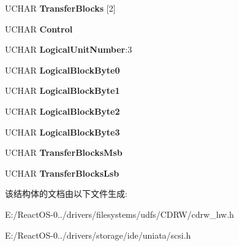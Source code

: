 \begin{DoxyCompactItemize}
\mbox{\label{struct___c_d_b_1_1___c_d_b10_ab3d4fc361e88bdafa199122f30c7bd25}} 
U\+C\+H\+AR {\bfseries Transfer\+Blocks} \mbox{[}2\mbox{]}
\item 
\mbox{\label{struct___c_d_b_1_1___c_d_b10_a61c45e0b32773a2a6463c7eb3a4ce93f}} 
U\+C\+H\+AR {\bfseries Control}
\item 
\mbox{\label{struct___c_d_b_1_1___c_d_b10_aeb78b3c0b7ca1cb5ff6459b6d13ad878}} 
U\+C\+H\+AR {\bfseries Logical\+Unit\+Number}\+:3
\item 
\mbox{\label{struct___c_d_b_1_1___c_d_b10_a681672e015a669b7182b9a05927e240e}} 
U\+C\+H\+AR {\bfseries Logical\+Block\+Byte0}
\item 
\mbox{\label{struct___c_d_b_1_1___c_d_b10_af9cb26c264e8a58efd48e5f1e4dc0cdb}} 
U\+C\+H\+AR {\bfseries Logical\+Block\+Byte1}
\item 
\mbox{\label{struct___c_d_b_1_1___c_d_b10_af07398013c913e7c45304e54d298d080}} 
U\+C\+H\+AR {\bfseries Logical\+Block\+Byte2}
\item 
\mbox{\label{struct___c_d_b_1_1___c_d_b10_aeaa3b17dca88d32cdec062d5873d73e0}} 
U\+C\+H\+AR {\bfseries Logical\+Block\+Byte3}
\item 
\mbox{\label{struct___c_d_b_1_1___c_d_b10_ac29f2eb7a92c7954abb1b9091bf3efe4}} 
U\+C\+H\+AR {\bfseries Transfer\+Blocks\+Msb}
\item 
\mbox{\label{struct___c_d_b_1_1___c_d_b10_a1f7eb6dd341eaa29801508ff3486e7c1}} 
U\+C\+H\+AR {\bfseries Transfer\+Blocks\+Lsb}
\end{DoxyCompactItemize}


该结构体的文档由以下文件生成\+:\begin{DoxyCompactItemize}
\item 
E\+:/\+React\+O\+S-\/0../drivers/filesystems/udfs/\+C\+D\+R\+W/cdrw\+\_\+hw.\+h\item 
E\+:/\+React\+O\+S-\/0../drivers/storage/ide/uniata/scsi.\+h\end{DoxyCompactItemize}
